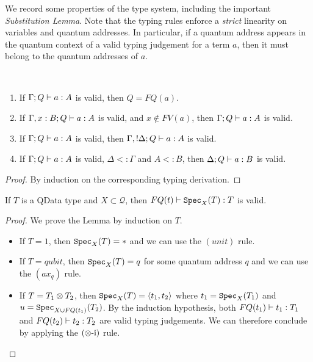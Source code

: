 \documentclass{article}
\begin{document}
We record some properties of the type system, including 
the important \emph{Substitution Lemma}. Note that the typing 
rules enforce a \emph{strict} linearity on variables and quantum addresses. 
In particular, if a quantum address appears in the quantum context of a 
valid typing judgement for a term $a$, then it must belong to the 
quantum addresses of $a$.

\begin{lemma}~
\label{prop_type_syst}
\begin{enumerate}
  \item If $\Gamma; Q \vdash a:A$ is valid, 
  then $Q=FQ(a)$.\label{q_context}
  \item If $\Gamma,x:B;Q \vdash a:A$ is valid, 
  and $x\notin FV(a)$, then $\Gamma;Q \vdash a:A$ is valid.\label{unused_var}
  \item If $\Gamma; Q \vdash a:A$ is valid, 
  then $\Gamma, !\Delta ; Q \vdash a:A$ is valid.\label{weakening}
  \item If $\Gamma ; Q \vdash a:A$ is valid, $\Delta <: \Gamma$
  and $A<:B$, then $\Delta ; Q \vdash a:B$ is valid.\label{subtype}
\end{enumerate}
\end{lemma}

\begin{proof}
By induction on the corresponding typing derivation.
\end{proof}

\begin{lemma}
\label{specimen}
If $T$ is a QData type and $X\subset \mathcal{Q}$, then 
$FQ(t)\vdash \texttt{Spec}_X(T):T$ is valid.
\end{lemma}

\begin{proof}
We prove the Lemma by induction on $T$.
  \begin{itemize}
    \item If $T=1$, then $\texttt{Spec}_X(T)=*$ and we can use the $(unit)$ rule.
    \item If $T=qubit$, then $\texttt{Spec}_X(T)=q$ for some quantum address $q$ and we can 
          use the $(ax_q)$ rule.
    \item If $T=T_1\otimes T_2$, then $\texttt{Spec}_X(T)=\langle t_1,t_2\rangle$ where $t_1=\texttt{Spec}_X(T_1)$ 
          and $u=\texttt{Spec}_{X\cup FQ(t_1)}(T_2)$. By the induction hypothesis, both 
          $FQ(t_1)\vdash t_1:T_1$ and $FQ(t_2)\vdash t_2:T_2$ are valid typing 
          judgements. We can therefore conclude by applying the $(\otimes\mbox{-i})$ rule.
  \end{itemize}
\end{proof}
\end{document}
